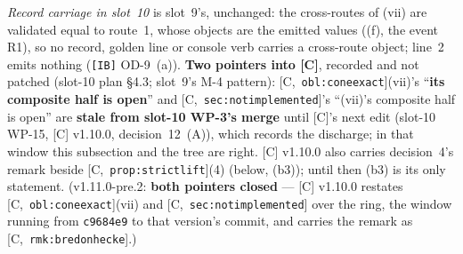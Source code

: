 \documentclass[11pt]{article}
\theoremstyle{remark}
\newcommand{\HA}[1]{[C,~\texttt{#1}]}      %
\begin{document}
\emph{Record carriage in slot~10} is slot~9's, unchanged: the cross-routes of (vii) are validated
equal to route~1, whose objects are the emitted values ((f), the event R1), so no record, golden
line or console verb carries a cross-route object; line~2 emits nothing (\texttt{[IB]} OD-9~(a)).
\textbf{Two pointers into [C]}, recorded and not patched (slot-10 plan \S4.3; slot~9's M-4
pattern): \HA{obl:coneexact}(vii)'s ``\textbf{its composite half is open}'' and
\HA{sec:notimplemented}'s ``(vii)'s composite half is open'' are \textbf{stale from slot-10 WP-3's
merge} until [C]'s next edit (slot-10 WP-15, [C] v1.10.0, decision~12~(A)), which records the
discharge; in that window this subsection and the tree are right. [C] v1.10.0 also carries
decision~4's remark beside \HA{prop:strictlift}(4) (below, (b3)); until then (b3) is its only
statement. (v1.11.0-pre.2: \textbf{both pointers closed} --- [C] v1.10.0 restates
\HA{obl:coneexact}(vii) and \HA{sec:notimplemented} over the ring, the window running from
\texttt{c9684e9} to that version's commit, and carries the remark as \HA{rmk:bredonhecke}.)
\end{document}
